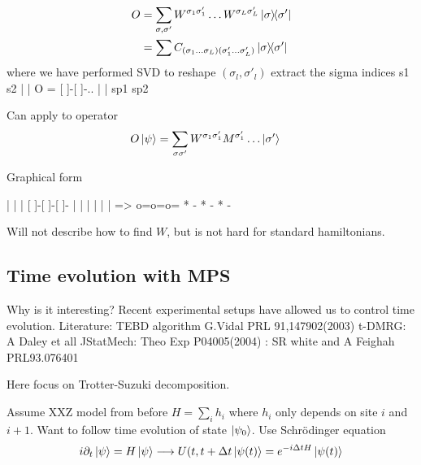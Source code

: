 \documentclass[a4paper]{article}
\begin{document}
\begin{align*}
    O&=\sum_{\sigma,\sigma'} W^{\sigma_1\sigma'_1}\dots W^{\sigma_L \sigma_L'}
    \ket{\sigma}\!\!\bra{\sigma'}\\
     &=\sum C_{(\sigma_1\dots\sigma_L)(\sigma_1'\dots\sigma_L')}
     \ket{\sigma}\!\!\bra{\sigma'}
\end{align*}
where we have performed SVD to reshape $(\sigma_l,\sigma'_l)$ extract the sigma indices 
         s1  s2
         |   |
    O = [ ]-[ ]-..
         |   |
         sp1 sp2

Can apply to operator
         \begin{align*}
             O\ket{\psi}&=\sum_{\sigma\sigma'}
             W^{\sigma_1\sigma'_1}M^{\sigma_1'}\dots\ket{\sigma'}
         \end{align*}


Graphical form

 |   |   | 
[ ]-[ ]-[ ]-          | | |
 |   |   |       =>   o=o=o=
 * - * - * -

 Will not describe how to find $W$, but is not hard for standard hamiltonians.
 \subsection{Time evolution with MPS}
Why is it interesting? Recent experimental setups have allowed us to control
time evolution.
Literature: TEBD algorithm G.Vidal PRL 91,147902(2003)
t-DMRG: A Daley et all JStatMech: Theo Exp P04005(2004) 
      : SR white and A Feighah PRL93.076401

Here focus on Trotter-Suzuki decomposition.

Assume XXZ model from before $H=\sum_i h_i$ where $h_i$ only depends on site $i$
and $i+1$.
Want to follow time evolution of state $\ket{\psi_0}$.
Use Schrödinger equation
\[
    i\partial_t\ket{\psi}=H\ket{\psi} \longrightarrow U(t,t+\Delta
    t\ket{\psi(t)}=e^{-i\Delta t H} \ket{\psi(t)}
\]
\end{document}
